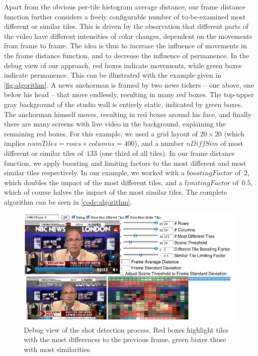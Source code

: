 \documentclass{acm_proc_article-sp}
\begin{document}
Apart from the obvious per-tile histogram average distance, our frame distance function further considers a freely configurable number of to-be-examined most different or similar tiles. This is driven by the observation that different parts of the video have different intensities of color changes, dependent on the movements from frame to frame. The idea is thus to increase the influence of movements in the frame distance function, and to decrease the influence of permanence. In the debug view of our approach, red boxes indicate movements, while green boxes indicate permanence. This can be illustrated with the example given in \autoref{fig:algorithm}. A news anchorman is framed by two news tickers -- one above, one below his head -- that move endlessly, resulting in many red boxes. The top-upper gray background of the studio wall is entirely static, indicated by green boxes. The anchorman himself moves, resulting in red boxes around his face, and finally there are many screens with live video in the background, explaining the remaining red boxes. For this example, we used a grid layout of $20 \times 20$ (which implies $\mathit{numTiles} = \mathit{rows} \times \mathit{columns} = 400$), and a number $\mathit{nDiffSim}$ of most different or similar tiles of~$133$ (one third of all tiles). In our frame distance function, we apply boosting and limiting factors to the most different and most similar tiles respectively. In our example, we worked with a $\mathit{boostingFactor}$ of~$2$, which doubles the impact of the most different tiles, and a $\mathit{limitingFactor}$ of~$0.5$, which of course halves the impact of the most similar tiles. The complete algorithm can be seen in \autoref{code:algorithm}.

\begin{figure}
\begin{center}
   \includegraphics[width=1.0\linewidth]{./resources/algorithm.png}
\end{center}
   \caption{Debug view of the shot detection process. Red boxes highlight tiles with the most differences to the previous frame, green boxes those with most similarities.}
\label{fig:algorithm}
\end{figure}
\end{document}
